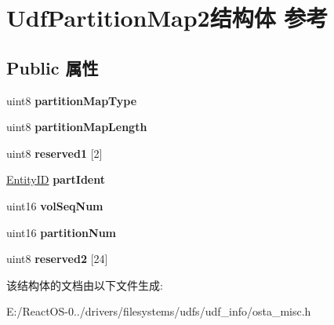 \hypertarget{struct_udf_partition_map2}{}\section{Udf\+Partition\+Map2结构体 参考}
\label{struct_udf_partition_map2}
\subsection*{Public 属性}
\begin{DoxyCompactItemize}
\item 
\mbox{\label{struct_udf_partition_map2_a0b35f9365e66a75f9ac01cd1e2f73065}} 
uint8 {\bfseries partition\+Map\+Type}
\item 
\mbox{\label{struct_udf_partition_map2_ac6957bf231d21a002f788f2c6434a8ba}} 
uint8 {\bfseries partition\+Map\+Length}
\item 
\mbox{\label{struct_udf_partition_map2_a103579d1cffe2cf503bd476a182fcc02}} 
uint8 {\bfseries reserved1} \mbox{[}2\mbox{]}
\item 
\mbox{\label{struct_udf_partition_map2_a1519fb54d89fb7995b2931b702a89336}} 
\hyperlink{struct_entity_i_d}{Entity\+ID} {\bfseries part\+Ident}
\item 
\mbox{\label{struct_udf_partition_map2_a6b96d4b6eee8367e2d47a051bd176184}} 
uint16 {\bfseries vol\+Seq\+Num}
\item 
\mbox{\label{struct_udf_partition_map2_a5020407af6be7ef94e610a216fb8c7d9}} 
uint16 {\bfseries partition\+Num}
\item 
\mbox{\label{struct_udf_partition_map2_a6629759efb5e34cd15d3704ce32f91ef}} 
uint8 {\bfseries reserved2} \mbox{[}24\mbox{]}
\end{DoxyCompactItemize}


该结构体的文档由以下文件生成\+:\begin{DoxyCompactItemize}
\item 
E\+:/\+React\+O\+S-\/0../drivers/filesystems/udfs/udf\+\_\+info/osta\+\_\+misc.\+h\end{DoxyCompactItemize}
